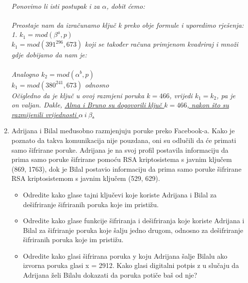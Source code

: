 \documentclass[12pt]{article}
\begin{document}
\begin{enumerate}
\begin{center}
{        \\}
         \vspace*{0.25cm}
         \textit{Ponovimo li isti postupak i za $\alpha$, dobit ćemo:\\ \vspace{0.15cm}}\\
           \vspace*{0.75cm}
           \textit{Preostaje nam da izračunamo ključ k preko obje formule i uporedimo rješenja:\\1. $k_1 = mod (\beta^a, p)$\\$k_1 = mod (391^{296}, 673)$ koji se također računa primjenom kvadriraj i množi gdje dobijamo da nam je: \\ }\\
            \vspace*{0.25cm}
            \textit{Analogno $k_2 = mod (\alpha^b, p)$\\$k_1 = mod (380^{241}, 673)$ odnosno \vspace{0.15cm}\\}
              \vspace*{0.25cm}
              \textit{Očigledno da je ključ u ovoj razmjeni poruka $k = 466$, vrijedi $k_1 = k_2$, pa je on valjan. Dakle, \underline{Alma i Bruno su dogovorili ključ $k = 466$, nakon što su razmijenili vrijednosti $\alpha\ i\ \beta$.}}
	    \end{center}
	    \vspace{0.5cm}
	    \item Adrijana i Bilal međusobno razmjenjuju poruke preko Facebook-a. Kako je poznato da takva komunikacija nije pouzdana, oni su odlučili da će primati samo šifrirane poruke. Adrijana je na svoj profil postavila informaciju da prima samo poruke šifrirane pomoću RSA kriptosistema s javnim ključem (869, 1763), dok je Bilal postavio informaciju da prima samo poruke šifrirane RSA kriptosistemom s javnim ključem (529, 629).\\
	    \begin{itemize}
\item Odredite kako glase tajni ključevi koje koriste Adrijana i Bilal za dešifriranje šifriranih poruka koje im pristižu.
\item Odredite kako glase funkcije šifriranja i dešifriranja koje koriste Adrijana i Bilal za šifriranje poruka koje šalju jedno drugom, odnosno za dešifriranje šifriranih poruka koje im pristižu.
\item Odredite kako glasi šifrirana poruka y koju Adrijana šalje Bilalu ako izvorna poruka glasi x = 2912. Kako glasi digitalni potpis z u slučaju da Adrijana želi Bilalu dokazati da poruka potiče baš od nje?

\end{itemize}
\end{enumerate}
\end{document}
